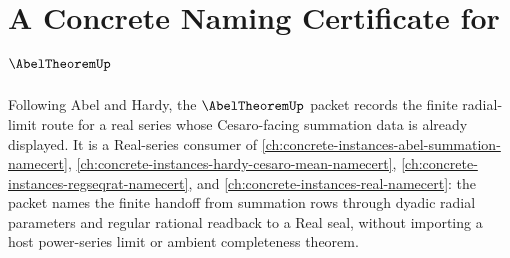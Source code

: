 \chapter{A Concrete Naming Certificate for $\AbelTheoremUp$}
\label{ch:concrete-instances-abel-theorem-namecert}

Following Abel and Hardy, the $\AbelTheoremUp$ packet records the finite radial-limit route for a real series whose Cesaro-facing summation data is already displayed. It is a Real-series consumer of \autoref{ch:concrete-instances-abel-summation-namecert}, \autoref{ch:concrete-instances-hardy-cesaro-mean-namecert}, \autoref{ch:concrete-instances-regseqrat-namecert}, and \autoref{ch:concrete-instances-real-namecert}: the packet names the finite handoff from summation rows through dyadic radial parameters and regular rational readback to a Real seal, without importing a host power-series limit or ambient completeness theorem.

